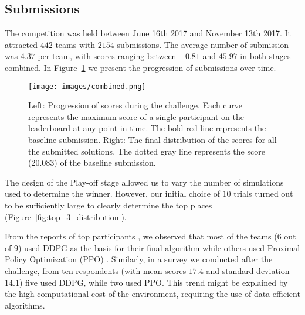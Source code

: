 \documentclass[graybox]{svmult}
\begin{document}
\subsection{Submissions}\label{ss:leaderboard}


The competition was held between June 16th 2017 and November 13th 2017. It attracted $442$ teams with $2154$ submissions. The average number of submission was $4.37$ per team, with scores ranging between $-0.81$ and $45.97$ in both stages combined. In Figure~\ref{fig:score_progression} we present the progression of submissions over time.

\begin{figure}[ht!]
\centering
\texttt{[image: images/combined.png]}
\caption{Left: Progression of scores during the challenge. Each curve represents the maximum score of a single participant on the leaderboard at any point in time. The bold red line represents the baseline submission. 
Right: The final distribution of the scores for all the submitted solutions. The dotted gray line represents the score (20.083) of the baseline submission.}
\label{fig:score_progression}
\end{figure}

The design of the Play-off stage allowed us to vary the number of simulations used to determine the winner. However, our initial choice of $10$ trials turned out to be sufficiently large to clearly determine the top places (Figure~\ref{fig:top_3_distribution}).

From the reports of top participants \cite{kidzinski2018l2rsolutions,jaskowski2018rltorunfast}, we observed that most of the teams (6 out of 9) used DDPG as the basis for their final algorithm while others used Proximal Policy Optimization (PPO) \cite{schulman2017proximal}. Similarly, in a survey we conducted after the challenge, from ten respondents (with mean scores $17.4$ and standard deviation $14.1$) five used DDPG, while two used PPO. This trend might be explained by the high computational cost of the environment, requiring the use of data efficient algorithms.
\end{document}
